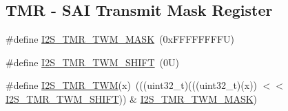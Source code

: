 \subsection*{T\+MR -\/ S\+AI Transmit Mask Register}
\begin{DoxyCompactItemize}
\item 
\#define \mbox{\hyperlink{group___i2_s___register___masks_ga0c694ab6fec26ca6fc159fe1d8ccb591}{I2\+S\+\_\+\+T\+M\+R\+\_\+\+T\+W\+M\+\_\+\+M\+A\+SK}}~(0x\+F\+F\+F\+F\+F\+F\+F\+F\+U)
\item 
\#define \mbox{\hyperlink{group___i2_s___register___masks_ga50ccb20fbe6c1de252bfe8ffba29fb3e}{I2\+S\+\_\+\+T\+M\+R\+\_\+\+T\+W\+M\+\_\+\+S\+H\+I\+FT}}~(0\+U)
\item 
\#define \mbox{\hyperlink{group___i2_s___register___masks_gad68d207aaa25383b7b3b2dd23c2a6d13}{I2\+S\+\_\+\+T\+M\+R\+\_\+\+T\+WM}}(x)~(((uint32\+\_\+t)(((uint32\+\_\+t)(x)) $<$$<$ \mbox{\hyperlink{group___i2_s___register___masks_ga50ccb20fbe6c1de252bfe8ffba29fb3e}{I2\+S\+\_\+\+T\+M\+R\+\_\+\+T\+W\+M\+\_\+\+S\+H\+I\+FT}})) \& \mbox{\hyperlink{group___i2_s___register___masks_ga0c694ab6fec26ca6fc159fe1d8ccb591}{I2\+S\+\_\+\+T\+M\+R\+\_\+\+T\+W\+M\+\_\+\+M\+A\+SK}})
\end{DoxyCompactItemize}

